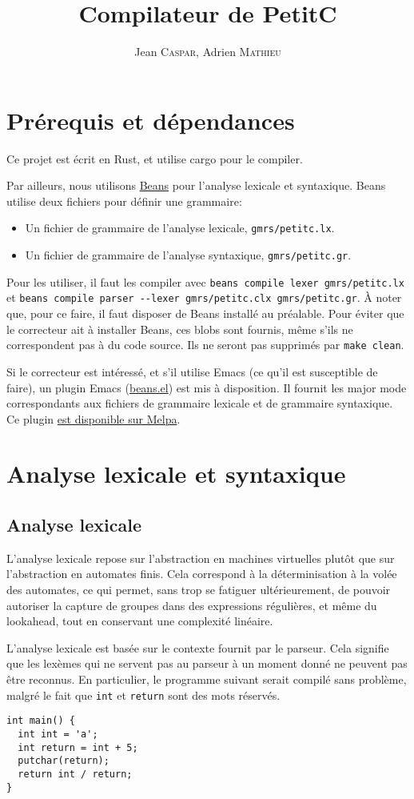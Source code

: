 \documentclass{scrartcl}
\title{Compilateur de PetitC}
\author{%
  Jean \textsc{Caspar},
  Adrien \textsc{Mathieu}
}
\date{}
\begin{document}
\maketitle{}

\section*{Prérequis et dépendances}
Ce projet est écrit en Rust, et utilise cargo pour le compiler.\par
Par ailleurs, nous utilisons \href{https://github.com/jthulhu/beans}{Beans}
pour l'analyse lexicale et syntaxique. Beans utilise deux fichiers pour définir
une grammaire:
\begin{itemize}
  \item Un fichier de grammaire de l'analyse lexicale, \verb|gmrs/petitc.lx|.
  \item Un fichier de grammaire de l'analyse syntaxique, \verb|gmrs/petitc.gr|.
\end{itemize}
Pour les utiliser, il faut les compiler avec \verb|beans compile lexer gmrs/petitc.lx|
et \verb|beans compile parser --lexer gmrs/petitc.clx gmrs/petitc.gr|. À noter
que, pour ce faire, il faut disposer de Beans installé au préalable. Pour éviter
que le correcteur ait à installer Beans, ces blobs sont fournis, même s'ils
ne correspondent pas à du code source. Ils ne seront pas supprimés par
\verb|make clean|.\par
Si le correcteur est intéressé, et s'il utilise Emacs (ce qu'il est susceptible
de faire), un plugin Emacs (\href{https://github.com/jthulhu/emacs-beans}{beans.el})
est mis à disposition. Il fournit les major mode correspondants aux fichiers
de grammaire lexicale et de grammaire syntaxique. Ce plugin
\href{https://melpa.org/#/beans}{est disponible sur Melpa}.

\section*{Analyse lexicale et syntaxique}
\subsection*{Analyse lexicale}
L'analyse lexicale repose sur l'abstraction en machines virtuelles plutôt que sur
l'abstraction en automates finis. Cela correspond à la déterminisation à la volée
des automates, ce qui permet, sans trop se fatiguer ultérieurement, de pouvoir
autoriser la capture de groupes dans des expressions régulières, et même du
lookahead, tout en conservant une complexité linéaire.\par
L'analyse lexicale est basée sur le contexte fournit par le parseur. Cela
signifie que les lexèmes qui ne servent pas au parseur à un moment donné ne
peuvent pas être reconnus. En particulier, le programme suivant serait compilé
sans problème, malgré le fait que \verb|int| et \verb|return| sont des mots
réservés.
\begin{verbatim}
int main() {
  int int = 'a';
  int return = int + 5;
  putchar(return);
  return int / return;
}
\end{verbatim}
\end{document}
